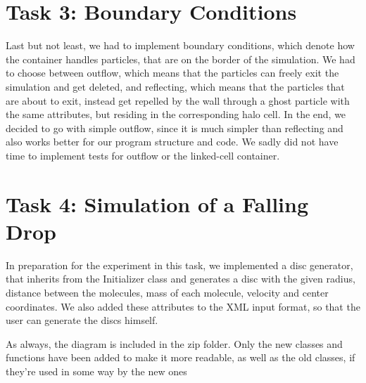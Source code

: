 \documentclass{article}
\begin{document}
\section{Task 3: Boundary Conditions}
Last but not least, we had to implement boundary conditions, which denote how the container handles particles, that are on the border of the simulation. We had to choose between outflow, which means that the particles can freely exit the simulation and get deleted, and reflecting, which means that the particles that are about to exit, instead get repelled by the wall through a ghost particle with the same attributes, but residing in the corresponding halo cell. In the end, we decided to go with simple outflow, since it is much simpler than reflecting and also works better for our program structure and code. We sadly did not have time to implement tests for outflow or the linked-cell container.

\section{Task 4: Simulation of a Falling Drop}
In preparation for the experiment in this task, we implemented a disc generator, that inherits from the Initializer class and generates a disc with the given radius, distance between the molecules, mass of each molecule, velocity and center coordinates. We also added these attributes to the XML input format, so that the user can generate the discs himself.

As always, the diagram is included in the zip folder. Only the new classes and functions have been added to make it more readable, as well as the old classes, if they're used in some way by the new ones
\end{document}
